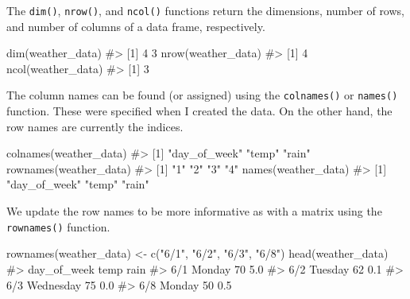 \documentclass[
  letterpaper,
]{latex/krantz}
\makeatletter
\newenvironment{Shaded}{\begin{snugshade}}{\end{snugshade}}
\newcommand{\CommentTok}[1]{\textcolor[rgb]{0.37,0.37,0.37}{#1}}
\newcommand{\FunctionTok}[1]{\textcolor[rgb]{0.28,0.35,0.67}{#1}}
\newcommand{\NormalTok}[1]{\textcolor[rgb]{0.00,0.23,0.31}{#1}}
\newcommand{\OtherTok}[1]{\textcolor[rgb]{0.00,0.23,0.31}{#1}}
\newcommand{\StringTok}[1]{\textcolor[rgb]{0.13,0.47,0.30}{#1}}
\newenvironment{kframe}{%
\medskip{}
\setlength{\fboxsep}{.8em}
 \def\at@end@of@kframe{}%
 \ifinner\ifhmode%
  \def\at@end@of@kframe{\end{minipage}}%
  \begin{minipage}{\columnwidth}%
 \fi\fi%
 \def\FrameCommand##1{\hskip\@totalleftmargin \hskip-\fboxsep
 \colorbox{shadecolor}{##1}\hskip-\fboxsep
     \hskip-\linewidth \hskip-\@totalleftmargin \hskip\columnwidth}%
 \MakeFramed {\advance\hsize-\width
   \@totalleftmargin\z@ \linewidth\hsize
   \@setminipage}}%
 {\par\unskip\endMakeFramed%
 \at@end@of@kframe}
\renewenvironment{Shaded}{\begin{kframe}}{\end{kframe}}
\makeatother
\begin{document}
The \texttt{dim()},
\texttt{nrow()}, and
\texttt{ncol()} functions
return the dimensions, number of rows, and number of columns of a data
frame, respectively.

\begin{Shaded}
\begin{Highlighting}[]
\FunctionTok{dim}\NormalTok{(weather\_data)}
\CommentTok{\#\textgreater{} [1] 4 3}
\FunctionTok{nrow}\NormalTok{(weather\_data)}
\CommentTok{\#\textgreater{} [1] 4}
\FunctionTok{ncol}\NormalTok{(weather\_data)}
\CommentTok{\#\textgreater{} [1] 3}
\end{Highlighting}
\end{Shaded}

The column names can be found (or assigned) using the
\texttt{colnames()} or
\texttt{names()} function.
These were specified when I created the data. On the other hand, the row
names are currently the indices.

\begin{Shaded}
\begin{Highlighting}[]
\FunctionTok{colnames}\NormalTok{(weather\_data)}
\CommentTok{\#\textgreater{} [1] "day\_of\_week" "temp"        "rain"}
\FunctionTok{rownames}\NormalTok{(weather\_data)}
\CommentTok{\#\textgreater{} [1] "1" "2" "3" "4"}
\FunctionTok{names}\NormalTok{(weather\_data)}
\CommentTok{\#\textgreater{} [1] "day\_of\_week" "temp"        "rain"}
\end{Highlighting}
\end{Shaded}

We update the row names to be more informative as with a matrix using
the
\texttt{rownames()}
function.

\begin{Shaded}
\begin{Highlighting}[]
\FunctionTok{rownames}\NormalTok{(weather\_data) }\OtherTok{\textless{}{-}} \FunctionTok{c}\NormalTok{(}\StringTok{"6/1"}\NormalTok{, }\StringTok{"6/2"}\NormalTok{, }\StringTok{"6/3"}\NormalTok{, }\StringTok{"6/8"}\NormalTok{)}
\FunctionTok{head}\NormalTok{(weather\_data)}
\CommentTok{\#\textgreater{}     day\_of\_week temp rain}
\CommentTok{\#\textgreater{} 6/1      Monday   70  5.0}
\CommentTok{\#\textgreater{} 6/2     Tuesday   62  0.1}
\CommentTok{\#\textgreater{} 6/3   Wednesday   75  0.0}
\CommentTok{\#\textgreater{} 6/8      Monday   50  0.5}
\end{Highlighting}
\end{Shaded}
\end{document}
